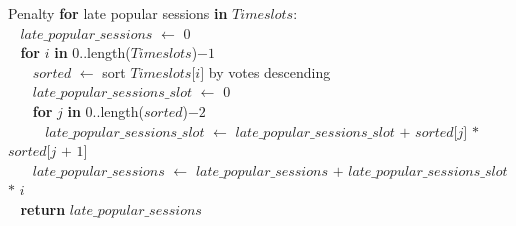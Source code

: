\begin{tabbing}Penalty {\bf for} late popular sessions {\bf in} $\textit{Timeslots}$$:$\\
$~~~~$$\textit{late\_popular\_sessions}$ $\leftarrow$ $0$\\
$~~~~${\bf for} $\textit{i}$ {\bf in} $0..$length($\textit{Timeslots}$)$-1$\\
$~~~~~~~~$$\textit{sorted}$ $\leftarrow$ sort $\textit{Timeslots}$$[$$\textit{i}$$]$ by votes descending\\
$~~~~~~~~$$\textit{late\_popular\_sessions\_slot}$ $\leftarrow$ $0$\\
$~~~~~~~~${\bf for} $\textit{j}$ {\bf in} $0..$length($\textit{sorted}$)$-2$\\
$~~~~~~~~~~~~$$\textit{late\_popular\_sessions\_slot}$ $\leftarrow$ $\textit{late\_popular\_sessions\_slot}$ $+$ $\textit{sorted}$$[$$\textit{j}$$]$ $*$ $\textit{sorted}$$[$$\textit{j}$ $+$ $1]$\\
$~~~~~~~~$$\textit{late\_popular\_sessions}$ $\leftarrow$ $\textit{late\_popular\_sessions}$ $+$ $\textit{late\_popular\_sessions\_slot}$ $*$ $\textit{i}$\\
$~~~~${\bf return} $\textit{late\_popular\_sessions}$\\
\end{tabbing}